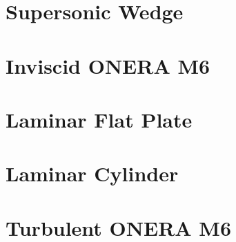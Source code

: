 \chapter{Supersonic Wedge}

\chapter{Inviscid ONERA M6}

\chapter{Laminar Flat Plate}

\chapter{Laminar Cylinder}

\chapter{Turbulent ONERA M6}
